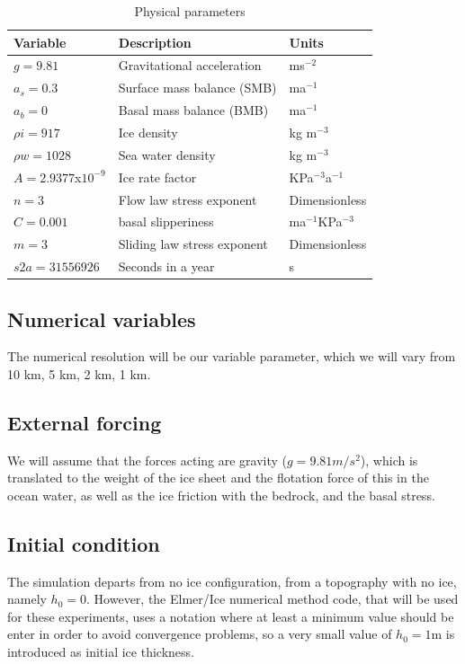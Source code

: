 \documentclass{article}
\begin{document}
\begin{table}[!h]
	\begin{center}
		\caption{Physical parameters}
		\label{Physical constants}
		\begin{tabular}{|l|l|l|}
			\hline
			Variable          & Description                 & Units           \\ \hline
			$g=9.81$         & Gravitational acceleration  & ms$^{-2}$         \\ \hline
			$a_s=0.3$       & Surface mass balance (SMB)  & ma$^{-1}$         \\ \hline
			$a_b=0$             & Basal mass balance (BMB)    &   ma$^{-1}$         \\ \hline
			$\rho i=917$        & Ice density                 & kg m$^{-3}$       \\ \hline
			$\rho w=1028$      & Sea water density           & kg m$^{-3}$       \\ \hline
			$A= 2.9377$x$10^{-9}$ & Ice rate factor             & KPa$^{-3}$a$^{-1}$  \\ \hline
			$n=3$               & Flow law stress exponent    &  Dimensionless               \\ \hline
			$C=0.001$           & basal slipperiness          & ma$^{-1}$KPa$^{-3}$ \\ \hline
			$m=3$               & Sliding law stress exponent &   Dimensionless              \\ \hline
			$s2a=31556926$     & Seconds in a year           & s         \\ \hline
		\end{tabular}
	\end{center}
\end{table}

\subsection{Numerical variables}
The numerical resolution will be our variable parameter, which we will vary from 10 km, 5 km, 2 km, 1 km.
\subsection{External forcing}
We will assume that the forces acting are gravity ($g=9.81 m/s^2$), which is translated to the weight of the ice sheet and the flotation force of this in the ocean water, as well as the ice friction with the bedrock, and the basal stress.
\subsection{Initial condition}
The simulation departs from no ice configuration, from a topography with no ice, namely $h_0 = 0$. However, the Elmer/Ice numerical method code, that will be used for these experiments, uses a notation where at least a minimum value should be enter in order to avoid convergence problems, so a very small value of $h_0 = 1$m is introduced as initial ice thickness. 
\end{document}
